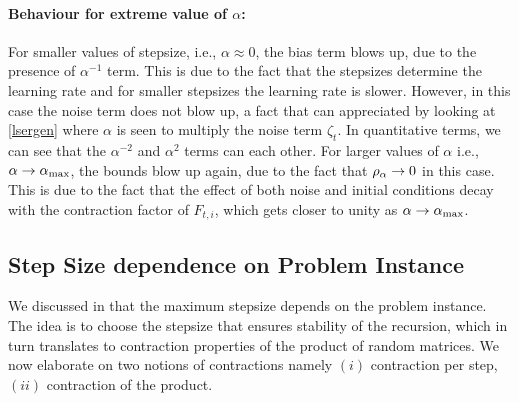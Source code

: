 \paragraph{Behaviour for extreme value of $\alpha$:} For smaller values of stepsize, i.e., $\alpha\approx 0$, the bias term blows up, due to the presence of $\alpha^{-1}$ term. This is due to the fact that the stepsizes determine the learning rate and for smaller stepsizes the learning rate is slower. However, in this case the noise term does not blow up, a fact that can appreciated by looking at \eqref{lsergen} where $\alpha$ is seen to multiply the noise term $\zeta_t$. In quantitative terms, we can see that the $\alpha^{-2}$ and $\alpha^2$ terms can each other. For larger values of $\alpha$ i.e., $\alpha\rightarrow \alpha_{\max}$, the bounds blow up again, due to the fact that $\rho_{\alpha}\rightarrow 0$ in this case. This is due to the fact that the effect of both noise and initial conditions decay with the contraction factor of $F_{t,i}$, which gets closer to unity as $\alpha\rightarrow\alpha_{\max}$.


\subsection{Step Size dependence on Problem Instance}
\label{sec:stepprob}
We discussed in  that the maximum stepsize depends on the problem instance. The idea is to choose the stepsize that ensures stability of the recursion, which in turn translates to contraction properties of the product of random matrices. We now elaborate on two notions of contractions namely $(i)$ contraction per step, $(ii)$ contraction of the product.
